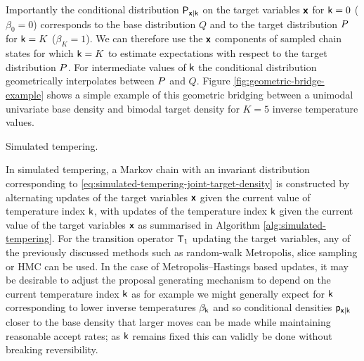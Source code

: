 Importantly the conditional distribution $\mathsf{P}_{\boldsymbol{\mathsf{x}}|\mathsf{k}}$ on the target variables $\boldsymbol{\mathsf{x}}$ for $\mathsf{k} = 0$ ($\beta_0 = 0$) corresponds to the base distribution $Q$ and to the target distribution $P$ for $\mathsf{k} = K$ ($\beta_K = 1$). We can therefore use the $\boldsymbol{\mathsf{x}}$ components of sampled chain states for which $\mathsf{k} = K$ to estimate expectations with respect to the target distribution $P$. For intermediate values of $\mathsf{k}$ the conditional distribution geometrically interpolates between $P$ and $Q$. Figure \ref{fig:geometric-bridge-example} shows a simple example of this geometric bridging between a unimodal univariate base density and bimodal target density for $K=5$ inverse temperature values.

\begin{algorithm}[!t]
\caption{Simulated tempering.}
\label{alg:simulated-tempering}

\end{algorithm}

In simulated tempering, a Markov chain with an invariant distribution corresponding to \eqref{eq:simulated-tempering-joint-target-density} is constructed by alternating updates of the target variables $\boldsymbol{\mathsf{x}}$ given the current value of temperature index $\mathsf{k}$, with updates of the temperature index $\mathsf{k}$ given the current value of the target variables $\boldsymbol{\mathsf{x}}$ as summarised in Algorithm \ref{alg:simulated-tempering}. For the transition operator $\mathsf{T}_1$ updating the target variables, any of the previously discussed methods such as random-walk Metropolis, slice sampling or \ac{HMC} can be used. In the case of Metropolis--Hastings based updates, it may be desirable to adjust the proposal generating mechanism to depend on the current temperature index $\mathsf{k}$ as for example we might generally expect for $\mathsf{k}$ corresponding to lower inverse temperatures $\beta_{\mathsf{k}}$ and so conditional densities $\mathsf{p}_{\boldsymbol{\mathsf{x}}|\mathsf{k}}$ closer to the base density that larger moves can be made while maintaining reasonable accept rates; as $\mathsf{k}$ remains fixed this can validly be done without breaking reversibility.

